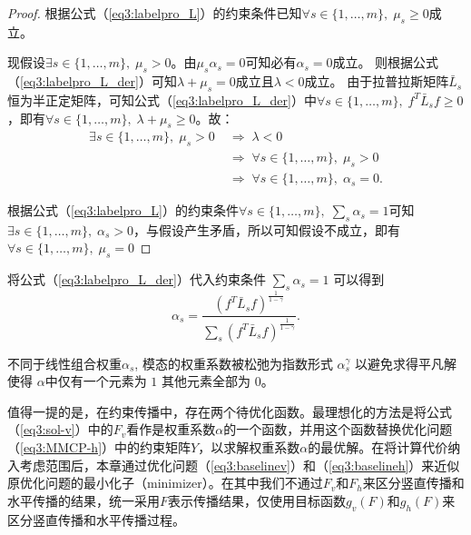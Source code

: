 \begin{proof}
    根据公式（\ref{eq3:labelpro_L}）的约束条件已知$ \forall s \in \{1,\dots,m\}, \;\mu_s \ge 0$成立。

    现假设$\exists s \in \{1,\dots,m\}, \; \mu_s>0 $。由$ \mu_s\alpha_s=0 $可知必有$\alpha_s=0 $成立。
    则根据公式（\ref{eq3:labelpro_L_der}）可知$\lambda + \mu_s = 0 $成立且$ \lambda<0 $成立。
    由于拉普拉斯矩阵$ {\bar{{L}}}_s $恒为半正定矩阵\cite{chung1997spectral}，可知公式（\ref{eq3:labelpro_L_der}）中$\forall s \in \{1,\dots,m\}, \;{f}^T {\bar{{L}}}_s{f} \ge 0$，即有$\forall s \in \{1,\dots,m\}, \; \lambda + \mu_s \ge 0 $。故：
    \begin{equation}
        \begin{split}
        \exists s \in \{1,\dots,m\}, \; \mu_s>0\; &\Rightarrow \;\lambda<0 \\&\Rightarrow \;\forall s \in \{1,\dots,m\}, \; \mu_s>0 \\&\Rightarrow \; \forall s \in \{1,\dots,m\}, \;\alpha_s=0.     
        \end{split}
    \end{equation}

    根据公式（\ref{eq3:labelpro_L}）的约束条件$ \forall s \in \{1,\dots,m\}, \;\sum_s \alpha_s = 1$可知$ \exists s \in \{1,\dots,m\}, \;\alpha_s>0$，与假设产生矛盾，所以可知假设不成立，即有$\forall s \in \{1,\dots,m\}, \; \mu_s=0 $
\end{proof}

将公式（\ref{eq3:labelpro_L_der}）代入约束条件 $ \sum_s \alpha_s=1 $ 可以得到
\begin{equation}
\alpha_s = \frac{({f}^T \bar{{L}}_s{f})^\frac{1}{1-\gamma}}{\sum_s({f}^T \bar{{L}}_s{f})^\frac{1}{1-\gamma}}.
\end{equation}

不同于线性组合权重$ \alpha_s$, 模态的权重系数被松弛为指数形式 $ \alpha_s^\gamma $ 以避免求得平凡解使得 $ {\alpha} $中仅有一个元素为 $ 1 $ 其他元素全部为 $ 0 $。

值得一提的是，在约束传播中，存在两个待优化函数。最理想化的方法是将公式（\ref{eq3:sol-v}）中的$ {F}_v $看作是权重系数$\alpha$的一个函数，并用这个函数替换优化问题（\ref{eq3:MMCP-h}）中的约束矩阵$Y$，以求解权重系数$\alpha$的最优解。在将计算代价纳入考虑范围后，本章通过优化问题（\ref{eq3:baselinev}）和（\ref{eq3:baselineh}）来近似原优化问题的最小化子（minimizer）。在其中我们不通过$F_v$和$F_h$来区分竖直传播和水平传播的结果，统一采用$F$表示传播结果，仅使用目标函数$g_v({F})$和$g_h({F})$来区分竖直传播和水平传播过程。

